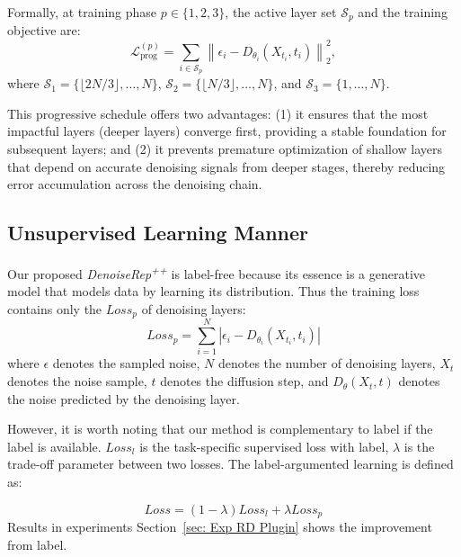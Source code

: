 \documentclass[conference]{IEEEtran}
\begin{document}
{{Formally, at training phase $p \in \{1, 2, 3\}$, the active layer set $\mathcal{S}_p$ and the training objective are:
\begin{equation}
\mathcal{L}_{\text{prog}}^{(p)} = \sum_{i \in \mathcal{S}_p} \left\| \epsilon_i - D_{\theta_i}(X_{t_i}, t_i) \right\|_2^2,
\label{eq:progressive_loss}
\end{equation}
where $\mathcal{S}_1 = \{\lfloor 2N/3 \rfloor, \ldots, N\}$, $\mathcal{S}_2 = \{\lfloor N/3 \rfloor, \ldots, N\}$, and $\mathcal{S}_3 = \{1, \ldots, N\}$.

This progressive schedule offers two advantages: (1) it ensures that the most impactful layers (deeper layers) converge first, providing a stable foundation for subsequent layers; and (2) it prevents premature optimization of shallow layers that depend on accurate denoising signals from deeper stages, thereby reducing error accumulation across the denoising chain.
}%


\subsection{Unsupervised Learning Manner}
\label{sec:methods label-free}
Our proposed \textit{DenoiseRep\textsuperscript{++}} is label-free because its essence is a generative model that models data by learning its distribution. Thus the training loss contains only the $Loss_p$ of denoising layers:
\begin{equation}
      Loss_{p} = \sum_{i = 1}^{N}\left |  \epsilon_{i} - D_{\theta _{i}}(X_{t_{i}}, t_{i})   \right |  
\end{equation}
where $\epsilon$ denotes the sampled noise, $N$ denotes the number of denoising layers, $X_t$ denotes the noise sample, $t$ denotes the diffusion step, and $D_\theta(X_t, t)$ denotes the noise predicted by the denoising layer.

However, it is worth noting that our method is complementary to label if the label is available. $Loss_{l}$ is the task-specific supervised loss with label, $\lambda$ is the trade-off parameter between two losses. The label-argumented learning is defined as: 

%
\begin{equation}
     Loss = (1-\lambda)Loss_{l} + \lambda Loss_p
\end{equation}
Results in experiments Section~\ref{sec: Exp RD Plugin} shows the improvement from label.


}
\end{document}
